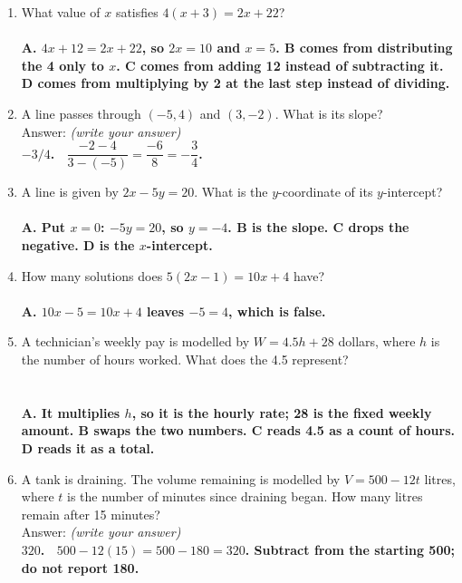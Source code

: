 \documentclass[11pt,a4paper]{article}
\newcommand{\spr}{\\[3pt]\hspace*{6pt}Answer: \underline{\hspace{3.2cm}}\hfill{\footnotesize\itshape(write your answer)}}
\newcommand{\ans}[1]{\ {\color{keyred}\bfseries #1}}
\newcommand{\ans}[1]{}
\begin{document}
\begin{enumerate}[leftmargin=20pt,itemsep=9pt]
\item What value of $x$ satisfies $4(x+3)=2x+22$?\\
  \ans{\\ A. $4x+12=2x+22$, so $2x=10$ and $x=5$. B comes from distributing the 4 only
  to $x$. C comes from adding 12 instead of subtracting it. D comes from multiplying
  by 2 at the last step instead of dividing.}

\item A line passes through $(-5,4)$ and $(3,-2)$. What is its slope? \spr
  \ans{\\ $-3/4$. \ $\dfrac{-2-4}{3-(-5)}=\dfrac{-6}{8}=-\dfrac{3}{4}$.}

\item A line is given by $2x-5y=20$. What is the $y$-coordinate of its $y$-intercept?\\
  \ans{\\ A. Put $x=0$: $-5y=20$, so $y=-4$. B is the slope. C drops the negative.
  D is the $x$-intercept.}

\item How many solutions does $5(2x-1)=10x+4$ have?\\
  \ans{\\ A. $10x-5=10x+4$ leaves $-5=4$, which is false.}

\item A technician's weekly pay is modelled by $W=4.5h+28$ dollars, where $h$ is the
  number of hours worked. What does the 4.5 represent?\\
  \\[2pt]
  \ans{\\ A. It multiplies $h$, so it is the hourly rate; 28 is the fixed weekly
  amount. B swaps the two numbers. C reads 4.5 as a count of hours. D reads it as a
  total.}

\item A tank is draining. The volume remaining is modelled by $V=500-12t$ litres, where
  $t$ is the number of minutes since draining began. How many litres remain after 15
  minutes? \spr
  \ans{\\ $320$. \ $500-12(15)=500-180=320$. Subtract from the starting 500; do not
  report 180.}
\end{enumerate}
\end{document}
